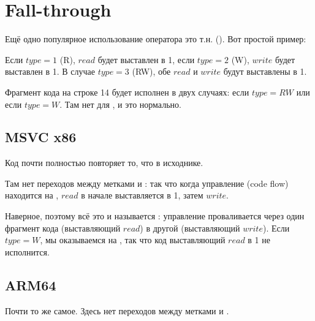 ﻿\section{Fall-through}

Ещё одно популярное использование оператора  это т.н.  ().
Вот простой пример:



Если $type=1$ (R), $read$ будет выставлен в 1, если $type=2$ (W), $write$ будет выставлен в 1.
В случае $type=3$ (RW), обе $read$ и $write$ будут выставлены в 1.

Фрагмент кода на строке 14 будет исполнен в двух случаях: если $type=RW$ или если $type=W$.
Там нет  для , и это нормально.

\subsection{MSVC x86}



Код почти полностью повторяет то, что в исходнике.

Там нет переходов между метками  и 
: так что когда управление (code flow) находится на 
, $read$ в начале выставляется в 1, затем $write$.

Наверное, поэтому всё это и называется : управление проваливается через
один фрагмент кода (выставляющий $read$) в другой (выставляющий $write$).
Если $type=W$, мы оказываемся на , 
так что код выставляющий $read$ в 1 не исполнится.

\subsection{ARM64}



Почти то же самое.
Здесь нет переходов между метками  и .

